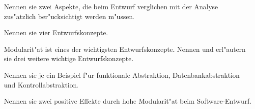 \documentclass[12pt]{exam}
\begin{document}
\begin{questions}
\question[2] Nennen sie zwei Aspekte, die beim Entwurf verglichen mit der Analyse zus"atzlich ber"ucksichtigt werden m"ussen.
\addpoints

\question[4] Nennen sie vier Entwurfskonzepte.
\addpoints

\question[6] Modularit"at ist eines der wichtigsten Entwurfskonzepte. Nennen und erl"autern sie drei weitere wichtige Entwurfskonzepte.
\addpoints

\question[3] Nennen sie je ein Beispiel f"ur funktionale Abstraktion, Datenbankabstraktion und Kontrollabstraktion.
\addpoints

\question[2] Nennen sie zwei positive Effekte durch hohe Modularit"at beim Software-Entwurf.
\addpoints

\begin{comment}
{%
\renewcommand*\thechoice{\arabic{choice}} 
\renewcommand*\choicelabel{\thechoice)}
%
\question[2] Element with $Z=92$ is:
\begin{multicols}{2}
\begin{choices}
\choice H
\choice O
\choice F
\choice S
\choice Ba
\choice Pb
\choice U
\choice Pu
\end{choices}
\end{multicols}
}%

\question[10]
In no more than one paragraph, explain why the earth is round.
\makeemptybox{2in}

\question[20]
Explain blah, blah\ldots
\makeemptybox{\fill}

\newpage

\question[20]
Explain blah, blah\ldots
\fillwithlines{\fill}

\newpage

\question[20]
Explain blah, blah\ldots
\fillwithdottedlines{8em}
\end{comment}

\end{questions}
\end{document}
